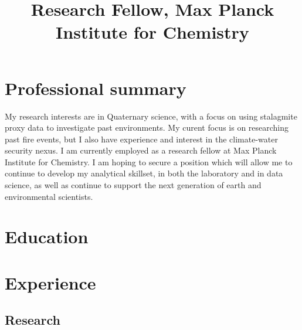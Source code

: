 \documentclass[11pt,a4paper,]{moderncv}
\title{Research Fellow, Max Planck Institute for Chemistry}
\begin{document}
\makecvtitle



\hypertarget{professional-summary}{%
\section{Professional summary}\label{professional-summary}}

My research interests are in Quaternary science, with a focus on using
stalagmite proxy data to investigate past environments. My curent focus
is on researching past fire events, but I also have experience and
interest in the climate-water security nexus. I am currently employed as
a research fellow at Max Planck Institute for Chemistry. I am hoping to
secure a position which will allow me to continue to develop my
analytical skillset, in both the laboratory and in data science, as well
as continue to support the next generation of earth and environmental
scientists.

\hypertarget{education}{%
\section{Education}\label{education}}

\nopagebreak
    \nopagebreak

\hypertarget{experience}{%
\section{Experience}\label{experience}}

\hypertarget{research}{%
\subsection{Research}\label{research}}
\end{document}
